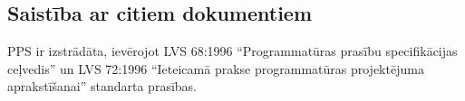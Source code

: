 \subsection*{Saistība ar citiem dokumentiem}
PPS ir izstrādāta, ievērojot LVS 68:1996 ``Programmatūras prasību specifikācijas ceļvedis'' un LVS 72:1996 ``Ieteicamā prakse programmatūras projektējuma  aprakstīšanai'' standarta prasības.
